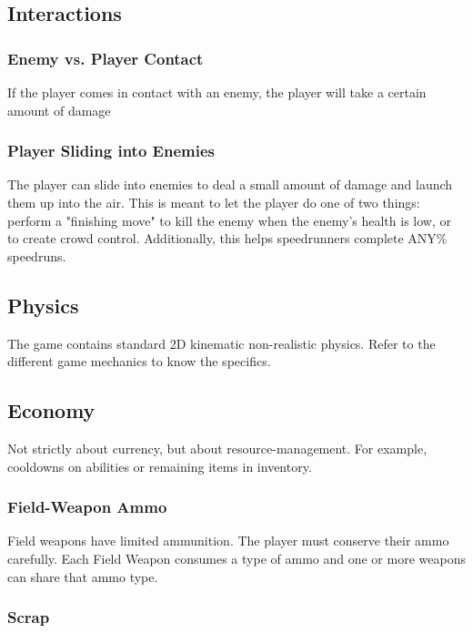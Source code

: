 \documentclass[12pt]{article}
\begin{document}
\subsection{Interactions}

\subsubsection{Enemy vs. Player Contact}

If the player comes in contact with an enemy, the player will take a certain amount of damage

\subsubsection{Player Sliding into Enemies}

The player can slide into enemies to deal a small amount of damage and launch them up into the air. This is meant to let the player do one of two things: perform a "finishing move" to kill the enemy when the enemy's health is low, or to create crowd control. Additionally, this helps speedrunners complete ANY\% speedruns. 

\subsection{Physics}

The game contains standard 2D kinematic non-realistic physics. Refer to the different game mechanics to know the specifics.

\subsection{Economy}

Not strictly about currency, but about resource-management. For example, cooldowns on abilities or remaining items in inventory. 

\subsubsection{Field-Weapon Ammo}

Field weapons have limited ammunition. The player must conserve their ammo carefully. Each Field Weapon consumes a type of ammo and one or more weapons can share that ammo type. 

\subsubsection{Scrap}
\end{document}
